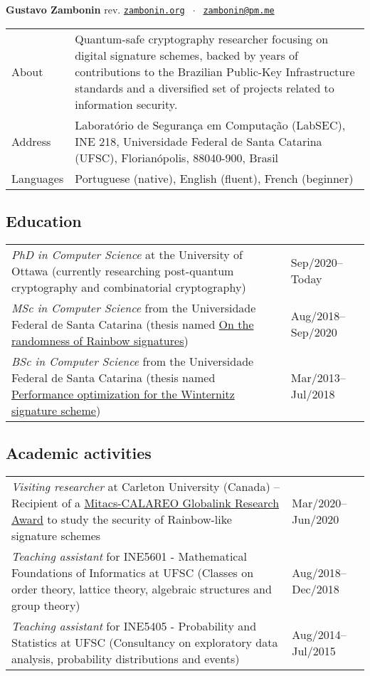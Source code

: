 \documentclass[12pt]{article}
\makeatletter
\newenvironment{sidetable}
  {\renewcommand{\arraystretch}{1.4}
   \newcolumntype{L}{>{\bf \raggedright}p{0.14\textwidth}}
   \newcolumntype{R}{p{0.82\textwidth}}
   \begin{tabular}{@{\hspace{0mm}}LR}}
  {\end{tabular}}
\newenvironment{contenttable}[1]
  {\subsection*{#1}
   \renewcommand{\arraystretch}{1.4}
   \newcolumntype{L}{p{0.82\textwidth}}
   \newcolumntype{R}{>{\raggedleft\arraybackslash}p{0.14\textwidth}}
   \begin{tabular}{@{\hspace{0mm}}LR}}
  {\end{tabular}}
\makeatother
\begin{document}
{\Large \textbf{Gustavo Zambonin}} {\tiny rev. \DTMtoday}
\hfill \href{https://zambonin.org}{\texttt{zambonin.org}}
    $\;\cdot\;$ \href{mailto:zambonin@pm.me}{\texttt{zambonin@pm.me}}

\begin{sidetable}
  About     & Quantum-safe cryptography researcher focusing on digital
              signature schemes, backed by years of contributions to the
              Brazilian Public-Key Infrastructure standards and a diversified
              set of projects related to information security. \\

  Address   & Laboratório de Segurança em Computação (LabSEC), INE 218,
              Universidade Federal de Santa Catarina (UFSC), Florianópolis,
              88040-900, Brasil \\

  Languages & Portuguese (native), English (fluent), French (beginner)
\end{sidetable}

\begin{contenttable}{Education}
  \emph{PhD in Computer Science} at the University of Ottawa (currently
    researching post-quantum cryptography and combinatorial cryptography)
    & Sep/2020--Today \\

  \emph{MSc in Computer Science} from the Universidade Federal de Santa
    Catarina (thesis named
    \href{https://repositorio.ufsc.br/handle/123456789/219497}{On the
    randomness of Rainbow signatures})
    & Aug/2018--Sep/2020 \\

  \emph{BSc in Computer Science} from the Universidade Federal de Santa
    Catarina (thesis named
    \href{https://repositorio.ufsc.br/handle/123456789/187875}{Performance
    optimization for the Winternitz signature scheme})
    & Mar/2013--Jul/2018
\end{contenttable}

\begin{contenttable}{Academic activities}
  \emph{Visiting researcher} at Carleton University (Canada) -- Recipient of
    a \href{http://archive.is/RHxm4}{Mitacs-CALAREO Globalink Research Award}
    to study the security of Rainbow-like signature schemes
    & Mar/2020--Jun/2020 \\

  \emph{Teaching assistant} for INE5601 - Mathematical Foundations of
    Informatics at UFSC (Classes on order theory, lattice theory, algebraic
    structures and group theory)
    & Aug/2018--Dec/2018 \\

  \emph{Teaching assistant} for INE5405 - Probability and Statistics at UFSC
    (Consultancy on exploratory data analysis, probability distributions and
    events)
    & Aug/2014--Jul/2015
\end{contenttable}
\end{document}
